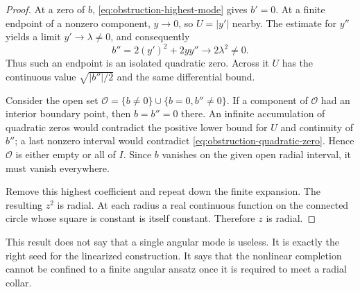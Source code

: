 \begin{proof}
At a zero of $b$, \eqref{eq:obstruction-highest-mode} gives
$b'=0$. At a finite endpoint of a nonzero component, $y\to0$,
so $U=|y'|$ nearby. The estimate for $y''$ yields a limit
$y'\to\lambda\ne0$, and consequently
\begin{equation}\label{eq:obstruction-quadratic-zero}
 b''=2(y')^2+2yy''\longrightarrow2\lambda^2\ne0.
\end{equation}
Thus such an endpoint is an isolated quadratic zero. Across it
$U$ has the continuous value $\sqrt{|b''|/2}$ and the same
differential bound.

Consider the open set
$\mathcal O=\{b\ne0\}\cup\{b=0, b''\ne0\}$.
If a component of $\mathcal O$ had an interior boundary point,
then $b=b''=0$ there. An infinite accumulation of quadratic zeros
would contradict the positive lower bound for $U$ and continuity
of $b''$; a last nonzero interval would contradict
\eqref{eq:obstruction-quadratic-zero}. Hence
$\mathcal O$ is either empty or all of $I$. Since $b$ vanishes
on the given open radial interval, it must vanish everywhere.

Remove this highest coefficient and repeat down the finite
expansion. The resulting $z^2$ is radial. At each radius a real
continuous function on the connected circle whose square is
constant is itself constant. Therefore $z$ is radial.
\end{proof}

This result does not say that a single angular mode is useless.
It is exactly the right seed for the linearized construction.
It says that the nonlinear completion cannot be confined to a
finite angular ansatz once it is required to meet a radial collar.
